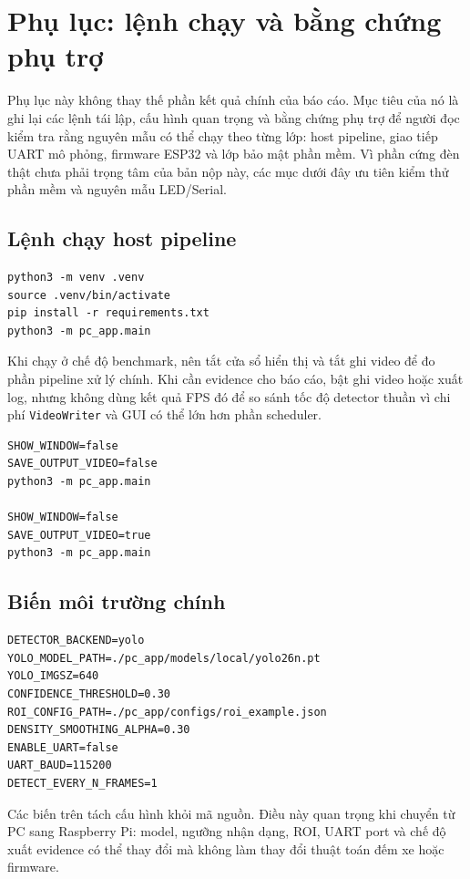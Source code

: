\appendix
\section{Phụ lục: lệnh chạy và bằng chứng phụ trợ}

Phụ lục này không thay thế phần kết quả chính của báo cáo. Mục tiêu của nó là ghi lại các lệnh tái lập, cấu hình quan trọng và bằng chứng phụ trợ để người đọc kiểm tra rằng nguyên mẫu có thể chạy theo từng lớp: host pipeline, giao tiếp UART mô phỏng, firmware ESP32 và lớp bảo mật phần mềm. Vì phần cứng đèn thật chưa phải trọng tâm của bản nộp này, các mục dưới đây ưu tiên kiểm thử phần mềm và nguyên mẫu LED/Serial.

\subsection{Lệnh chạy host pipeline}

\begin{lstlisting}
python3 -m venv .venv
source .venv/bin/activate
pip install -r requirements.txt
python3 -m pc_app.main
\end{lstlisting}

Khi chạy ở chế độ benchmark, nên tắt cửa sổ hiển thị và tắt ghi video để đo phần pipeline xử lý chính. Khi cần evidence cho báo cáo, bật ghi video hoặc xuất log, nhưng không dùng kết quả FPS đó để so sánh tốc độ detector thuần vì chi phí \texttt{VideoWriter} và GUI có thể lớn hơn phần scheduler.

\begin{lstlisting}
SHOW_WINDOW=false
SAVE_OUTPUT_VIDEO=false
python3 -m pc_app.main

SHOW_WINDOW=false
SAVE_OUTPUT_VIDEO=true
python3 -m pc_app.main
\end{lstlisting}

\subsection{Biến môi trường chính}

\begin{lstlisting}
DETECTOR_BACKEND=yolo
YOLO_MODEL_PATH=./pc_app/models/local/yolo26n.pt
YOLO_IMGSZ=640
CONFIDENCE_THRESHOLD=0.30
ROI_CONFIG_PATH=./pc_app/configs/roi_example.json
DENSITY_SMOOTHING_ALPHA=0.30
ENABLE_UART=false
UART_BAUD=115200
DETECT_EVERY_N_FRAMES=1
\end{lstlisting}

Các biến trên tách cấu hình khỏi mã nguồn. Điều này quan trọng khi chuyển từ PC sang Raspberry Pi: model, ngưỡng nhận dạng, ROI, UART port và chế độ xuất evidence có thể thay đổi mà không làm thay đổi thuật toán đếm xe hoặc firmware.

